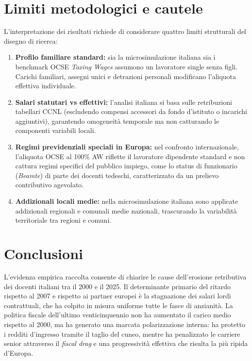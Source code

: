 \documentclass[11pt,a4paper]{article}
\begin{document}
\section{Limiti metodologici e cautele}
L'interpretazione dei risultati richiede di considerare quattro limiti strutturali del disegno di ricerca:
\begin{enumerate}
    \item \textbf{Profilo familiare standard:} sia la microsimulazione italiana sia i benchmark OCSE \textit{Taxing Wages} assumono un lavoratore single senza figli. Carichi familiari, assegni unici e detrazioni personali modificano l'aliquota effettiva individuale.
    \item \textbf{Salari statutari vs effettivi:} l'analisi italiana si basa sulle retribuzioni tabellari CCNL (escludendo compensi accessori da fondo d'istituto o incarichi aggiuntivi), garantendo omogeneità temporale ma non catturando le componenti variabili locali.
    \item \textbf{Regimi previdenziali speciali in Europa:} nel confronto internazionale, l'aliquota OCSE al 100\% AW riflette il lavoratore dipendente standard e non cattura regimi specifici del pubblico impiego, come lo status di funzionario (\textit{Beamte}) di parte dei docenti tedeschi, caratterizzato da un prelievo contributivo agevolato.
    \item \textbf{Addizionali locali medie:} nella microsimulazione italiana sono applicate addizionali regionali e comunali medie nazionali, trascurando la variabilità territoriale tra regioni e comuni.
\end{enumerate}

\section{Conclusioni}
L'evidenza empirica raccolta consente di chiarire le cause dell'erosione retributiva dei docenti italiani tra il 2000 e il 2025. Il determinante primario del ritardo rispetto al 2007 e rispetto ai partner europei è la stagnazione dei salari lordi contrattuali, che ha colpito in misura uniforme tutte le fasce di anzianità. La politica fiscale dell'ultimo venticinquennio non ha aumentato il carico medio rispetto al 2000, ma ha generato una marcata polarizzazione interna: ha protetto i redditi d'ingresso tramite il taglio del cuneo, mentre ha penalizzato le carriere senior attraverso il \textit{fiscal drag} e una progressività effettiva che risulta la più ripida d'Europa.
\end{document}
